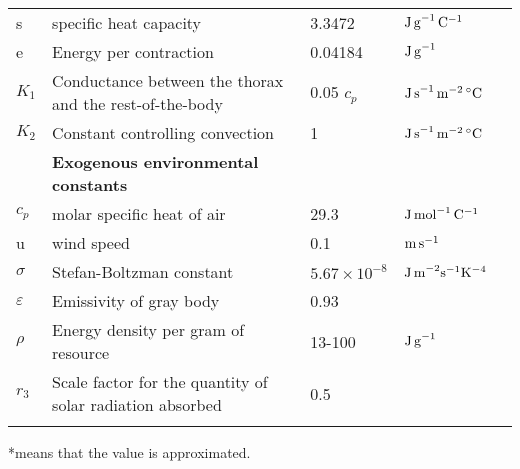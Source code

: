 \begin{sidewaystable}
\begin{tabular}{l l l l l}
s & specific heat capacity & 3.3472 & $\rm{J \, g}^{-1}\,\rm{C}^{-1}$ & \citet{Heinrich1975} \\
e & Energy per contraction & 0.04184 & $\rm{J \, g}^{-1}$ &\citet{Kammer1974} \\
$K_1$& Conductance between the thorax and the rest-of-the-body & 0.05 $c_p$ & $\rm{J \,s}^{-1} \, \rm{m}^{-2} \, ^{\circ}\rm{C}$  & \citet{Campbell2012} \\
$K_2$& Constant controlling convection & 1   & $\rm{J \,s}^{-1} \, \rm{m}^{-2} \, ^{\circ}\rm{C}$  & \citet{Campbell2012} \\
\hline
& \textbf{Exogenous environmental constants} & & &  \\
$c_p$ & molar specific heat of air  & 29.3 &  $\rm{J \, mol}^ {-1} \, \rm{C}^ {-1}$ & \citet{Campbell2012} \\
u &  wind speed & 0.1 & $\rm{m \, s}^{-1}$ & \\
$\sigma$ & Stefan-Boltzman constant & $5.67 \times 10^{-8}$ &  $\rm{J \, m}^{-2} \rm{s}^{-1} \rm{K}^{-4}  $  &  \\
$\varepsilon$& Emissivity of gray body & 0.93& & \citep{Campbell2012} \\
$\rho$ &Energy density per gram of resource & 13-100 &  $\rm{J \, g}^{-1}$  &  \\  %
$r_3$  & Scale factor for the quantity of solar radiation absorbed & 0.5 &  &  \\
\hline
\label{table:table1}
\end{tabular}
\raggedright{*means that the value is approximated.}
\end{sidewaystable}



